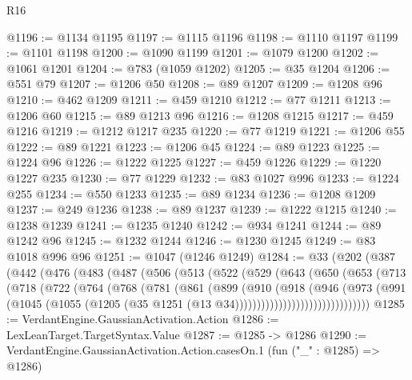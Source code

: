 \begin{lexlean}{R16}
\begin{coremodule}
@1196 := @1134 @1195
@1197 := @1115 @1196
@1198 := @1110 @1197
@1199 := @1101 @1198
@1200 := @1090 @1199
@1201 := @1079 @1200
@1202 := @1061 @1201
@1204 := @783 (@1059 @1202)
@1205 := @35 @1204
@1206 := @551 @79
@1207 := @1206 @50
@1208 := @89 @1207
@1209 := @1208 @96
@1210 := @462 @1209
@1211 := @459 @1210
@1212 := @77 @1211
@1213 := @1206 @60
@1215 := @89 @1213 @96
@1216 := @1208 @1215
@1217 := @459 @1216
@1219 := @1212 @1217 @235
@1220 := @77 @1219
@1221 := @1206 @55
@1222 := @89 @1221
@1223 := @1206 @45
@1224 := @89 @1223
@1225 := @1224 @96
@1226 := @1222 @1225
@1227 := @459 @1226
@1229 := @1220 @1227 @235
@1230 := @77 @1229
@1232 := @83 @1027 @996
@1233 := @1224 @255
@1234 := @550 @1233
@1235 := @89 @1234
@1236 := @1208 @1209
@1237 := @249 @1236
@1238 := @89 @1237
@1239 := @1222 @1215
@1240 := @1238 @1239
@1241 := @1235 @1240
@1242 := @934 @1241
@1244 := @89 @1242 @96
@1245 := @1232 @1244
@1246 := @1230 @1245
@1249 := @83 @1018 @996 @96
@1251 := @1047 (@1246 @1249)
@1284 := @33
    (@202
      (@387
        (@442
          (@476
            (@483
              (@487
                (@506
                  (@513
                    (@522
                      (@529
                        (@643
                          (@650
                            (@653
                              (@713
                                (@718
                                  (@722
                                    (@764
                                      (@768
                                        (@781
                                          (@861
                                            (@899
                                              (@910
                                                (@918
                                                  (@946
                                                    (@973
                                                      (@991
                                                        (@1045
                                                          (@1055
                                                            (@1205
                                                              (@35
                                                                @1251
                                                                (@13
                                                                  @34)))))))))))))))))))))))))))))))
@1285 := VerdantEngine.GaussianActivation.Action
@1286 := LexLeanTarget.TargetSyntax.Value
@1287 := @1285 -> @1286
@1290 := VerdantEngine.GaussianActivation.Action.casesOn.{1} (fun ("_" : @1285) => @1286)

\end{coremodule}
\end{lexlean}
